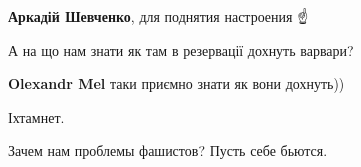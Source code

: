 \begin{itemize}
\textbf{Аркадій Шевченко}, для поднятия настроения ☝️

 
А на що нам знати як там в резервації дохнуть варвари?

\begin{itemize}
 
\textbf{Olexandr Mel} таки приємно знати як вони дохнуть))
\end{itemize}

 
Іхтамнет.

 
Зачем нам проблемы фашистов? Пусть себе бьются.

\end{itemize}


